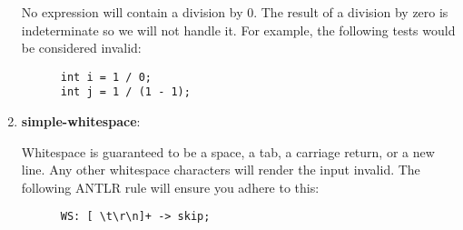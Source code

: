\documentclass{article}
\newcommand{\assertiondest}[1]{\hypertarget{#1}{\textbf{#1}:}}
\begin{document}
\begin{enumerate}
    No expression will contain a division by 0. The result of a division by zero is indeterminate
    so we will not handle it. For example, the following tests would be considered invalid:
    \begin{lstlisting}
      int i = 1 / 0;
      int j = 1 / (1 - 1);
    \end{lstlisting}
  \item
    \assertiondest{simple-whitespace}
    Whitespace is guaranteed to be a space, a tab, a carriage return, or a new
    line. Any other whitespace characters will render the input invalid. The following ANTLR rule
    will ensure you adhere to this:
    \begin{lstlisting}
      WS: [ \t\r\n]+ -> skip;
    \end{lstlisting}
\end{enumerate}
\end{document}
